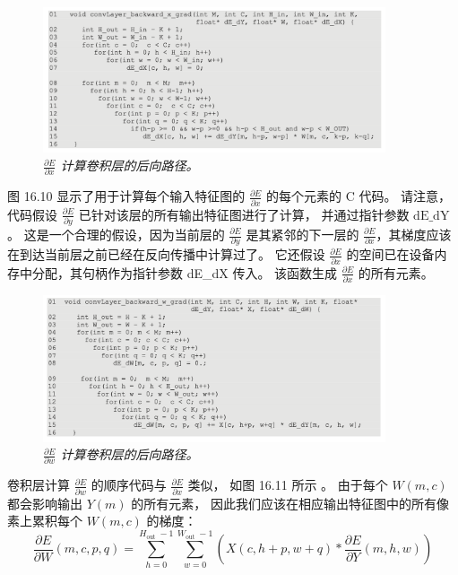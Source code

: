 \begin{figure}[H]
	\centering
	\includegraphics[width=0.9\textwidth]{figs/F16.10.png}
	\caption{\textit{$\frac{\partial E}{\partial x}$ 计算卷积层的后向路径。}}
\end{figure}

图 16.10 显示了用于计算每个输入特征图的 $\frac{\partial E}{\partial x}$ 的每个元素的 $\mathrm{C}$ 代码。 
请注意，代码假设 $\frac{\partial E}{\partial y}$ 已针对该层的所有输出特征图进行了计算，
并通过指针参数 $\mathrm{dE} \_\mathrm{ dY}$。 
这是一个合理的假设，因为当前层的 $\frac{\partial E}{\partial y}$ 
是其紧邻的下一层的 $\frac{\partial E}{\partial x}$，其梯度应该 在到达当前层之前已经在反向传播中计算过了。 
它还假设 $\frac{\partial E}{\partial x}$ 的空间已在设备内存中分配，其句柄作为指针参数 dE\_dX 传入。 
该函数生成 $\frac{\partial E}{\partial x}$ 的所有元素。

\begin{figure}[H]
	\centering
	\includegraphics[width=0.9\textwidth]{figs/F16.11.png}
	\caption{\textit{$\frac{\partial E}{\partial w}$ 计算卷积层的后向路径。}}
\end{figure}

卷积层计算 $\frac{\partial E}{\partial w}$ 的顺序代码与 $\frac{\partial E}{\partial x}$ 类似，
如图 16.11 所示 。 由于每个 $W(m, c)$ 都会影响输出 $Y(m)$ 的所有元素，
因此我们应该在相应输出特征图中的所有像素上累积每个 $W(m, c)$ 的梯度：
$$
\frac{\partial E}{\partial W}(m, c, p, q)=\sum_{h=0}^{H_{\text {out }}-1} \sum_{w=0}^ {W_{\text {out }}-1}\left(X(c, h+p, w+q) * \frac{\partial E}{\partial Y}(m, h, w)\right)
$$

